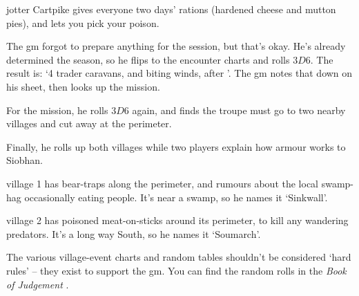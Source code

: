 \begin{multicols}{2}
{\begin{description}
    \Gls{jotter} Cartpike gives everyone two days' rations (hardened cheese and mutton pies), and lets you pick your poison.
  \end{description}

}{
  The \gls{gm} forgot to prepare anything for the session, but that's okay.
  He's already determined the season, so he flips to the encounter charts and rolls $3D6$.
  The result is: `4 trader caravans, and biting winds, after '.
  The \gls{gm} notes that down on his sheet, then looks up the mission.

  For the mission, he rolls $3D6$ again, and finds the troupe must go to two nearby \glspl{village} and cut away at the perimeter.

  Finally, he rolls up both \glspl{village} while two players explain how armour works to Siobhan.

  \Gls{village} 1 has bear-traps along the perimeter, and rumours about the local swamp-hag occasionally eating people.
  It's near a swamp, so he names it `Sinkwall'.

  \Gls{village} 2 has poisoned meat-on-sticks around its perimeter, to kill any wandering predators.
  It's a long way South, so he names it `Soumarch'.

  The various \gls{village}-event charts and random tables shouldn't be considered `hard rules' -- they exist to support the \gls{gm}.
  You can find the random rolls in the \textit{Book of Judgement}%
  \iftoggle{judgement}{, \autoref{encounters}, \autopageref{encounters}}{}.
}

\end{multicols}
